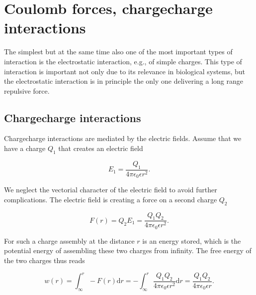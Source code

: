 \documentclass[letterpaper,10pt,english]{sphinxmanual}
\begin{document}
\section{Coulomb forces, charge\textendash{}charge interactions}
\label{\detokenize{notebooks/L7/1_Forces and Interactions:Coulomb-forces,-charge_charge-interactions}}
\sphinxAtStartPar
The simplest but at the same time also one of the most important types of interaction is the electrostatic interaction, e.g., of simple charges. This type of interaction is important not only due to its relevance in biological systems, but the electrostatic interaction is in principle the only one delivering a long range repulsive force.


\subsection{Charge\textendash{}charge interactions}
\label{\detokenize{notebooks/L7/1_Forces and Interactions:Charge_charge-interactions}}
\sphinxAtStartPar
Charge\textendash{}charge interactions are mediated by the electric fields. Assume that we have a charge \(Q_1\) that creates an electric field

\sphinxAtStartPar
\begin{equation}
E_{1}=\frac{Q_{1}}{4\pi \epsilon_{0}\epsilon r^2}.
\end{equation}

\sphinxAtStartPar
We neglect the vectorial character of the electric field to avoid further complications. The electric field is creating a force on a second charge \(Q_2\)

\sphinxAtStartPar
\begin{equation}
F(r)=Q_{2}E_{1}=\frac{Q_{1}Q_{2}}{4\pi \epsilon_{0}\epsilon r^2}.
\end{equation}

\sphinxAtStartPar
For such a charge assembly at the distance \(r\) is an energy stored, which is the potential energy of assembling these two charges from infinity. The free energy of the two charges thus reads

\sphinxAtStartPar
\begin{equation}
w(r)=\int_{\infty}^{r}-F(r)\mathrm dr=-\int_{\infty}^{r} \frac{Q_{1}Q_{2}}{4\pi \epsilon_{0}\epsilon r^{2}}\mathrm dr=\frac{Q_{1}Q_{2}}{4\pi \epsilon_{0}\epsilon r}.
\end{equation}
\end{document}

